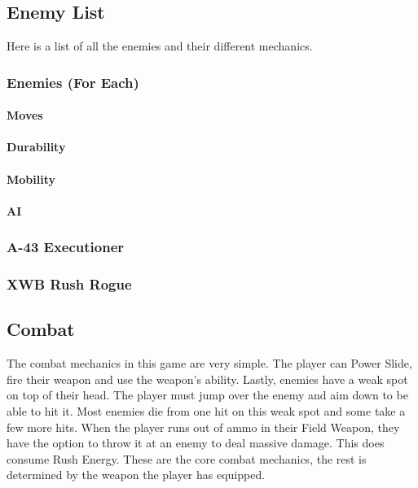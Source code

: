 \documentclass[12pt]{article}
\begin{document}
\subsection{Enemy List}

Here is a list of all the enemies and their different mechanics. 

\subsubsection{Enemies (For Each)}

\paragraph{Moves}

\paragraph{Durability}

\paragraph{Mobility}

\paragraph{AI}

\subsubsection{A-43 Executioner}

\subsubsection{XWB Rush Rogue}



\subsection{Combat}

The combat mechanics in this game are very simple. The player can Power Slide, fire their weapon and use the weapon's ability. Lastly, enemies have a weak spot on top of their head. The player must jump over the enemy and aim down to be able to hit it. Most enemies die from one hit on this weak spot and some take a few more hits. When the player runs out of ammo in their Field Weapon, they have the option to throw it at an enemy to deal massive damage. This does consume Rush Energy.
These are the core combat mechanics, the rest is determined by the weapon the player has equipped.
\end{document}
